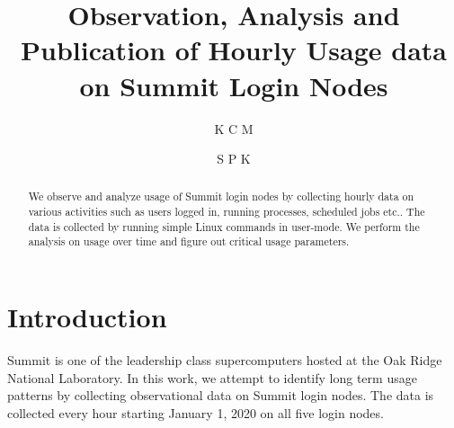 \documentclass[sigconf]{acmart}
\begin{document}
\title{Observation, Analysis and Publication of Hourly Usage data on Summit Login Nodes}

\author{K C M}
\author{S P K}
\authornotemark[1]

\renewcommand{\shortauthors}{Maheshwari and Parete-Koon}

\begin{abstract}

We observe and analyze usage of Summit login nodes by collecting hourly data on
various activities such as users logged in, running processes, scheduled jobs
etc..  The data is collected by running simple Linux commands in user-mode.  We
perform the analysis on usage over time and figure out critical usage
parameters.

\end{abstract}


\maketitle

\section{Introduction}
Summit is one of the leadership class supercomputers hosted at the Oak Ridge
National Laboratory. In this work, we attempt to identify long term usage
patterns by collecting observational data on Summit login nodes. The data is
collected every hour starting January 1, 2020 on all five login nodes.
\end{document}
